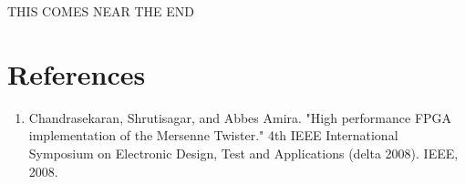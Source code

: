 \documentclass{article}
\begin{document}
    THIS COMES NEAR THE END

    \break
    \section*{References}

    \begin{enumerate}

    \item Chandrasekaran, Shrutisagar, and Abbes Amira. "High performance FPGA implementation of the Mersenne Twister." 4th IEEE International Symposium on Electronic Design, Test and Applications (delta 2008). IEEE, 2008.

    \end{enumerate}
    
\end{document}
